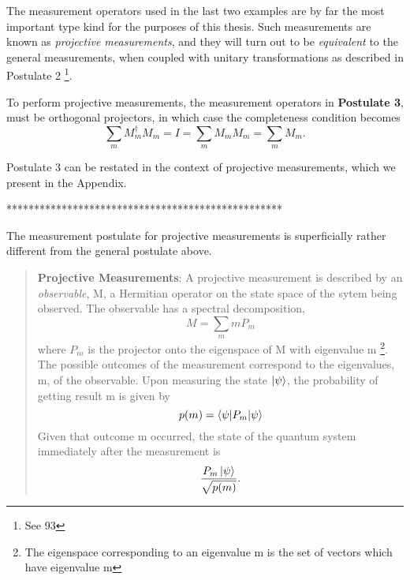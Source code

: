 {%

\label{subsection:projective measurement}
The measurement operators used in the last two examples are by far the most important type kind for the purposes of this thesis.  Such measurements are known as \textit{projective measurements}, and they will turn out to be \textit{equivalent} to the general measurements, when coupled with unitary transformations as described in Postulate 2 \footnote{See \cite{Wehner:notes} 93}. 


To perform projective measurements, the measurement operators in \textbf{Postulate 3}, must be orthogonal projectors, in which case the completeness condition becomes
\begin{equation}
\sum\limits_m M_m^\dagger M_m = I = \sum\limits_m M_m M_m = \sum\limits_m M_m.
\end{equation}

Postulate 3 can be restated in the context of projective measurements, which we present in the Appendix.

**************************************************


The measurement postulate for projective measurements is superficially rather different from the general postulate above.
\begin{quote}
    \textbf{Projective Measurements}: A projective measurement is described by an \textit{observable}, M, a Hermitian operator on the state space of the sytem being observed. The observable has a spectral decomposition,
    \begin{equation}
        M=\sum_m m P_m
    \end{equation}
    where $P_m$ is the projector onto the eigenspace of M with eigenvalue m \footnote{The eigenspace corresponding to an eigenvalue m is the set of vectors which have eigenvalue m}. The possible outcomes of the measurement correspond to the eigenvalues, m, of the observable. Upon measuring the state $\ket{\psi}$, the probability of getting result m is given by 
    \begin{equation}
        p(m)=\braket{\psi|P_m|\psi}
    \end{equation}
    Given that outcome m occurred, the state of the quantum system immediately after the measurement is 
    \begin{equation}
        \frac{P_m \ket{\psi}}{\sqrt{p(m)}}.
    \end{equation}
\end{quote}

}
